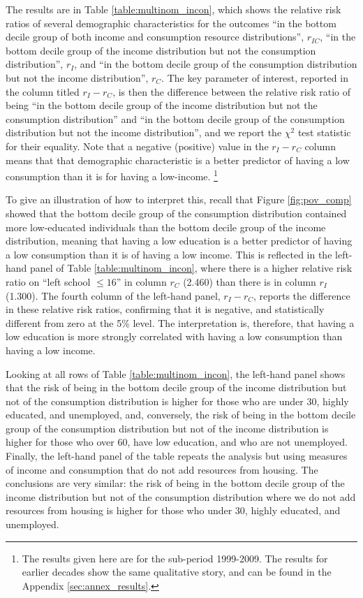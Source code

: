 The results are in Table \ref{table:multinom_incon}, which shows the relative risk ratios of several demographic characteristics for the outcomes ``in the bottom decile group of both income and consumption resource distributions'', $r_{IC}$, ``in the bottom decile group of the income distribution but not the consumption distribution'', $r_{I}$, and ``in the bottom decile group of the consumption distribution but not the income distribution'', $r_{C}$.  The key parameter of interest, reported in the column titled $r_{I}-r_{C}$, is then the difference between the relative risk ratio of being ``in the bottom decile group of the income distribution but not the consumption distribution'' and ``in the bottom decile group of the consumption distribution but not the income distribution'', and we report the $\chi^{2}$ test statistic for their equality. Note that a negative (positive) value in the $r_{I}-r_{C}$ column means that that demographic characteristic is a better predictor of having a low consumption than it is for having a low-income. \footnote{The results given here are for the sub-period 1999-2009. The results for earlier decades show the same qualitative story, and can be found in the Appendix \ref{sec:annex_results}.}

To give an illustration of how to interpret this, recall that Figure \ref{fig:pov_comp} showed that the bottom decile group of the consumption distribution contained more low-educated individuals than the bottom decile group of the income distribution, meaning that having a low education is a better predictor of having a low consumption than it is of having a low income. This is reflected in the left-hand panel of Table \ref{table:multinom_incon}, where there is a higher relative risk ratio on ``left school $\leq16$'' in column $r_{C}$ (2.460) than there is in column $r_{I}$ (1.300). The fourth column of the left-hand panel, $r_{I}-r_{C}$, reports the difference in these relative risk ratios, confirming that it is negative, and statistically different from zero at the 5\% level. The interpretation is, therefore, that  having a low education is more strongly correlated with having a low consumption than having a low income.

Looking at all rows of Table \ref{table:multinom_incon}, the left-hand panel shows that the risk of being in the bottom decile group of the income distribution but not of the consumption distribution is higher for those who are under 30, highly educated, and unemployed, and, conversely, the risk of being in the bottom decile group of the consumption distribution but not of the income distribution is higher for those who over 60, have low education, and who are not unemployed.  Finally, the left-hand panel of the table repeats the analysis but using measures of income and consumption that do not add resources from housing. The conclusions are very similar: the risk of being in the bottom decile group of the income distribution but not of the consumption distribution where we do not add resources from housing is higher for those who under 30, highly educated, and unemployed.

